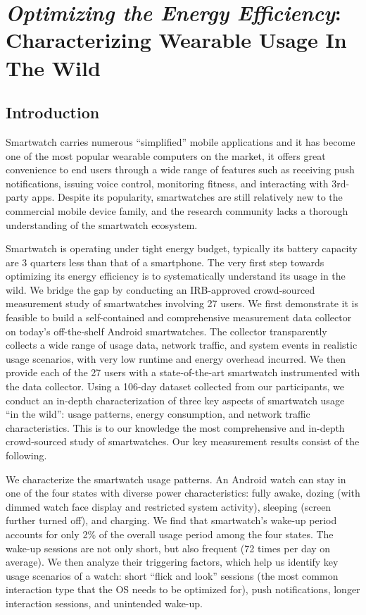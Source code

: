 \chapter{\emph{Optimizing the Energy Efficiency}: Characterizing Wearable Usage In The Wild} \label{chap:wearable}



\section{Introduction}


Smartwatch carries numerous ``simplified'' mobile applications and it has become one of the most popular wearable computers on the market, it offers great convenience to end users through a wide range of
features such as receiving push notifications, issuing voice control,
monitoring fitness, and interacting with 3rd-party apps. Despite
its popularity, smartwatches are still relatively new to the
commercial mobile device family, and the research community
lacks a thorough understanding of the smartwatch ecosystem. 

Smartwatch is operating under tight energy budget, typically its battery capacity are 3 quarters less than that of a smartphone. The very first step towards optimizing its energy efficiency is to systematically understand its usage in the wild. We bridge the gap by conducting an IRB-approved crowd-sourced measurement study of smartwatches involving 27 users. We first demonstrate it is feasible to build
a self-contained and comprehensive measurement data collector
on today’s off-the-shelf Android smartwatches. The collector
transparently collects a wide range of usage data, network traffic,
and system events in realistic usage scenarios, with very low
runtime and energy overhead incurred. We then provide each
of the 27 users with a state-of-the-art smartwatch instrumented with
the data collector. Using a 106-day dataset collected from our participants, we conduct an in-depth characterization of three key
aspects of smartwatch usage “in the wild”: usage patterns, energy
consumption, and network traffic characteristics. This is to our
knowledge the most comprehensive and in-depth crowd-sourced
study of smartwatches. Our key measurement results consist of
the following.

\BULLET We characterize the smartwatch usage patterns. An Android
watch can stay in one of the four states with diverse power
characteristics: fully awake, dozing (with dimmed watch face
display and restricted system activity), sleeping (screen further
turned off), and charging. We find that smartwatch’s wake-up
period accounts for only 2\% of the overall usage period among
the four states. The wake-up sessions are not only short, but
also frequent (72 times per day on average). We then analyze
their triggering factors, which help us identify key usage scenarios
of a watch: short ``flick and look'' sessions (the most common
interaction type that the OS needs to be optimized for), push
notifications, longer interaction sessions, and unintended wake-up.

